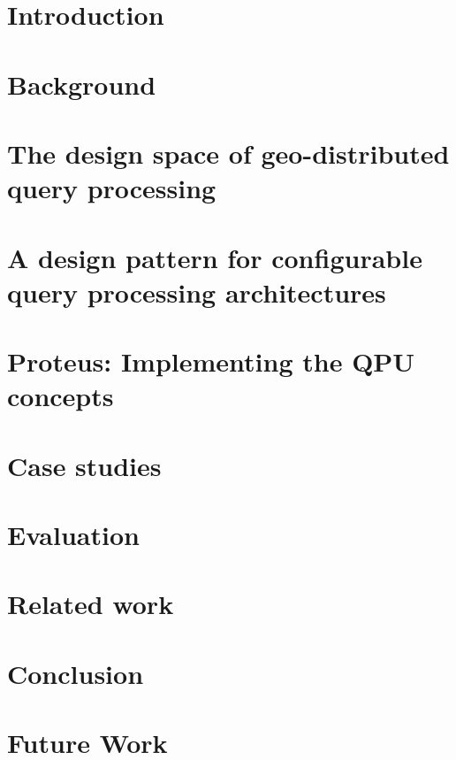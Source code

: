 \chapter{Introduction}
\label{ch:intro}


\chapter{Background}
\label{ch:background}


\chapter{The design space of geo-distributed query processing}
\label{ch:design_space}


\chapter{A design pattern for configurable query processing architectures}
\label{ch:design_pattern}


\chapter{Proteus: Implementing the QPU concepts}
\label{ch:proteus}


\chapter{Case studies}
\label{ch:case_studies}


\chapter{Evaluation}
\label{ch:evaluation}


\chapter{Related work}
\label{ch:related_work}


\chapter{Conclusion}
\label{ch:conclusion}


\chapter{Future Work}
\label{ch:future_work}

